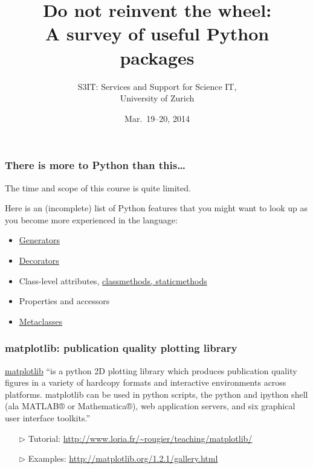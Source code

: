 \documentclass[english,serif,mathserif,xcolor=pdftex,dvipsnames,table]{beamer}
\title[Introduction]{%
  Do not reinvent the wheel:
  \\
  A survey of useful Python packages
}
\author[S3IT]{%
  S3IT: Services and Support for Science IT, \\
  University of Zurich
}
\date{Mar.~19--20, 2014}
\begin{document}
\maketitle

\begin{frame}
  \frametitle{There is more to Python than this\ldots}

  The time and scope of this course is quite limited.

  \+
  Here is an (incomplete) list of Python features that you might
  want to look up as you become more experienced in the language:
  \begin{itemize}
  \item
    \href{http://docs.python.org/2/tutorial/classes.html\#generators}{Generators}
  \item \href{http://www.artima.com/weblogs/viewpost.jsp?thread=240808}{Decorators}
  \item Class-level attributes, \href{http://stackoverflow.com/a/12179752/1808780}{classmethods, staticmethods}
  \item Properties and accessors
  \item \href{http://stackoverflow.com/a/6581949/459543}{Metaclasses}
  \end{itemize}
\end{frame}


\begin{frame}[fragile]
  \frametitle{matplotlib: publication quality plotting library}

  \href{http://matplotlib.org/}{matplotlib} ``is a python 2D plotting
  library which produces publication quality figures in a variety of
  hardcopy formats and interactive environments across
  platforms. matplotlib can be used in python scripts, the python and
  ipython shell (ala MATLAB® or Mathematica®), web application
  servers, and six graphical user interface toolkits.''

  \+
  \begin{itemize}
  \item[$\triangleright$] Tutorial: {\footnotesize\url{http://www.loria.fr/~rougier/teaching/matplotlib/}}
  \item[$\triangleright$] Examples: {\footnotesize\url{http://matplotlib.org/1.2.1/gallery.html}}
  \end{itemize}
\end{frame}
\end{document}
